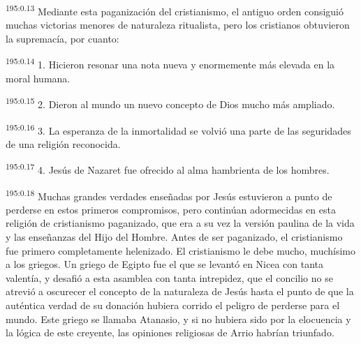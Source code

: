\par 
\textsuperscript{195:0.13} Mediante esta paganización del cristianismo, el antiguo orden consiguió muchas victorias menores de naturaleza ritualista, pero los cristianos obtuvieron la supremacía, por cuanto:

\par 
\textsuperscript{195:0.14} 1. Hicieron resonar una nota nueva y enormemente más elevada en la moral humana.

\par 
\textsuperscript{195:0.15} 2. Dieron al mundo un nuevo concepto de Dios mucho más ampliado.

\par 
\textsuperscript{195:0.16} 3. La esperanza de la inmortalidad se volvió una parte de las seguridades de una religión reconocida.

\par 
\textsuperscript{195:0.17} 4. Jesús de Nazaret fue ofrecido al alma hambrienta de los hombres.

\par 
\textsuperscript{195:0.18} Muchas grandes verdades enseñadas por Jesús estuvieron a punto de perderse en estos primeros compromisos, pero continúan adormecidas en esta religión de cristianismo paganizado, que era a su vez la versión paulina de la vida y las enseñanzas del Hijo del Hombre. Antes de ser paganizado, el cristianismo fue primero completamente helenizado. El cristianismo le debe mucho, muchísimo a los griegos. Un griego de Egipto fue el que se levantó en Nicea con tanta valentía, y desafió a esta asamblea con tanta intrepidez, que el concilio no se atrevió a oscurecer el concepto de la naturaleza de Jesús hasta el punto de que la auténtica verdad de su donación hubiera corrido el peligro de perderse para el mundo. Este griego se llamaba Atanasio, y si no hubiera sido por la elocuencia y la lógica de este creyente, las opiniones religiosas de Arrio habrían triunfado.

